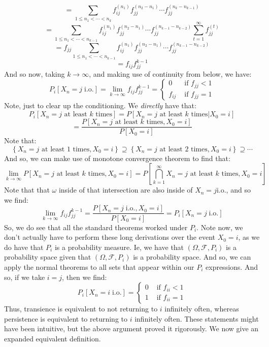 \documentclass[12pt,a4paper]{article}
\newcommand{\1}[1]{\mathbbm{1}\left\{ #1 \right\}}
\newcommand{\fcal}{\mathcal{F}}
\newcommand{\io}{\text{i.o.}}
\begin{document}
$$
	= \sum_{1 \leq n_1 < \cdots < n_k} f_{ij}^{(n_1)}f_{jj}^{(n_2 - n_1)} \cdots f_{jj}^{(n_k - n_{k-1})}
$$
$$
	= \sum_{1 \leq n_1 < \cdots < n_{k-1}} f_{ij}^{(n_1)}f_{jj}^{(n_2 - n_1)} \cdots f_{jj}^{(n_{k-1} - n_{k-2})} \sum_{t=1}^\infty f_{jj}^{(t)}
$$
$$
	= f_{jj} \sum_{1 \leq n_1 < \cdots < n_{k-1}} f_{ij}^{(n_1)}f_{jj}^{(n_2 - n_1)} \cdots f_{jj}^{(n_{k-1} - n_{k-2})} 
$$
$$
	= f_{ij}f_{jj}^{k - 1}
$$
And so now, taking $k \to \infty$, and making use of continuity from below, we have:
$$
	P_i\left[X_n = j \;\io\right] =
	\lim_{k \to \infty} f_{ij}f_{jj}^{k - 1} =
	\begin{cases}
	0 & \text{ if $f_{jj} < 1$}\\
	f_{ij} & \text{ if $f_{jj} = 1$}
	\end{cases}
$$
Note, just to clear up the conditioning. We \textit{directly} have that:
$$
	P_i\left[X_n = j \text{ at least $k$ times}\right] =
	P\left[X_n = j \text{ at least $k$ times} | X_0 = i\right]
$$
$$
	=
	\frac{P\left[X_n = j \text{ at least $k$ times}, X_0 = i\right]}{P[X_0 = i]}
$$
Note that:
$$
	\left\{X_n = j \text{ at least $1$ times}, X_0 = i\right\} \supseteq 
	\left\{X_n = j \text{ at least $2$ times}, X_0 = i\right\} \supseteq \cdots
$$
And so, we can make use of monotone convergence theorem to find that:
$$
	\lim_{k \to \infty} P\left[X_n = j \text{ at least $k$ times}, X_0 = i\right] =
	P\left[\bigcap_{k = 1}^\infty X_n = j \text{ at least $k$ times}, X_0 = i\right]
$$
Note that that $\omega$ inside of that intersection are also inside of $X_n = j \io$, and so we find:
$$
	\lim_{k \to \infty} f_{ij}f_{jj}^{k - 1} =
	\frac{P\left[X_n = j \;\io, X_0 = i\right]}{P[X_0 = i]} = P_i\left[X_n = j \;\io\right]
$$
So, we do see that all the standard theorems worked under $P_i$. Note now, we don't actually have to perform these long derivations over the event $X_0 = i$, as we do have that $P_i$ is a probability measure. Ie, we have that $(\Omega, \fcal, P_i)$ is a probability space given that $(\Omega, \fcal, P_i)$ is a probability space. And so, we can apply the normal theorems to all sets that appear within our $P_i$ expressions. And so, if we take $i = j$, then we find:
$$
	P_i\left[X_n = i \;\io\right] =
	\begin{cases}
		0 & \text{ if $f_{ii} < 1$}\\
		1 & \text{ if $f_{ii} = 1$}
	\end{cases}
$$
Thus, transience is equivalent to not returning to $i$ infinitely often, whereas persistence is equivalent to returning to $i$ infinitely often. These statements might have been intuitive, but the above argument proved it rigorously. We now give an expanded equivalent definition.
\end{document}
